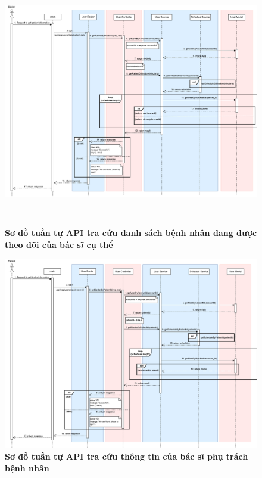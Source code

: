 \begin{figure}[H]
	\centering
	\includegraphics[width=16cm, height=11cm]{Images/api_sequence/user/getPatientByDoctorId.drawio.png}
	\caption[Sơ đồ tuần tự API tra cứu danh sách bệnh nhân đang được theo dõi của bác sĩ cụ thể]{\bfseries \fontsize{12pt}{0pt}\selectfont Sơ đồ tuần tự API tra cứu danh sách bệnh nhân đang được theo dõi của bác sĩ cụ thể}
	\label{sequence_diagram_get_patient_data}
\end{figure}

\begin{figure}[H]
	\centering
	\includegraphics[width=16cm]{Images/api_sequence/user/getDoctorByPatientId.drawio.png}
	\caption[Sơ đồ tuần tự API tra cứu thông tin của bác sĩ phụ trách bệnh nhân]{\bfseries \fontsize{12pt}{0pt}\selectfont Sơ đồ tuần tự API tra cứu thông tin của bác sĩ phụ trách bệnh nhân}
	\label{sequence_diagram_get_doctor_data}
\end{figure}

